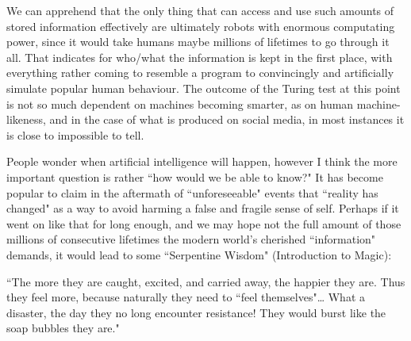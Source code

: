 \begin{footnotesize}
\begin{sffamily}
We can apprehend that the only thing that can access and use such amounts of stored information effectively are
ultimately robots with enormous computating power, since it would take humans maybe millions of lifetimes to go through
it all. That indicates for who/what the information is kept in the first place, with everything rather coming to
resemble a program to convincingly and artificially simulate popular human behaviour. The outcome of the Turing test at
this point is not so much dependent on machines becoming smarter, as on human machine-likeness, and in the case of what
is produced on social media, in most instances it is close to impossible to tell.

People wonder when artificial intelligence will happen, however I think the more important question is rather ``how would
we be able to know?" It has become popular to claim in the aftermath of ``unforeseeable" events that ``reality has
changed" as a way to avoid harming a false and fragile sense of self. Perhaps if it went on like that for long enough,
and we may hope not the full amount of those millions of consecutive lifetimes the modern world's
cherished ``information" demands, it would lead to some ``Serpentine Wisdom" (Introduction to Magic):

``The more they are caught, excited, and carried away, the happier they are. Thus they feel more, because naturally they
need to ``feel themselves"… What a disaster, the day they no long encounter resistance! They would burst like the soap
bubbles they are."


\end{sffamily}\end{footnotesize}
